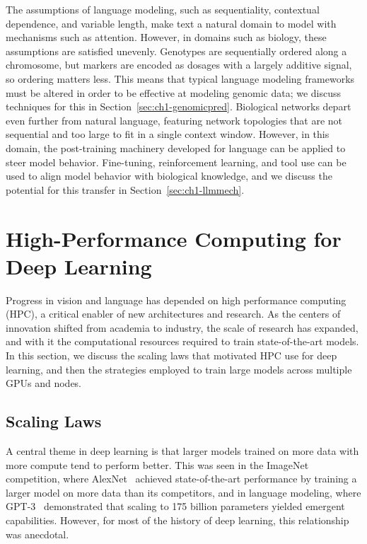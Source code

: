 The assumptions of language modeling, such as sequentiality, contextual dependence, and variable length, make text a natural domain to model with mechanisms such as attention. However, in domains such as biology, these assumptions are satisfied unevenly. Genotypes are sequentially ordered along a chromosome, but markers are encoded as dosages with a largely additive signal, so ordering matters less. This means that typical language modeling frameworks must be altered in order to be effective at modeling genomic data; we discuss techniques for this in Section~\ref{sec:ch1-genomicpred}. Biological networks depart even further from natural language, featuring network topologies that are not sequential and too large to fit in a single context window. However, in this domain, the post-training machinery developed for language can be applied to steer model behavior. Fine-tuning, reinforcement learning, and tool use can be used to align model behavior with biological knowledge, and we discuss the potential for this transfer in Section~\ref{sec:ch1-llmmech}.

\section{High-Performance Computing for Deep Learning}\label{sec:ch1-hpc}
Progress in vision and language has depended on high performance computing (HPC), a critical enabler of new architectures and research. As the centers of innovation shifted from academia to industry, the scale of research has expanded, and with it the computational resources required to train state-of-the-art models. In this section, we discuss the scaling laws that motivated HPC use for deep learning, and then the strategies employed to train large models across multiple GPUs and nodes.

\subsection{Scaling Laws}\label{sec:ch1-scaling}
A central theme in deep learning is that larger models trained on more data with more compute tend to perform better. This was seen in the ImageNet competition, where AlexNet~\cite{krizhevsky2012imagenet} achieved state-of-the-art performance by training a larger model on more data than its competitors, and in language modeling, where GPT-3~\cite{brown2020language} demonstrated that scaling to 175 billion parameters yielded emergent capabilities. However, for most of the history of deep learning, this relationship was anecdotal.

